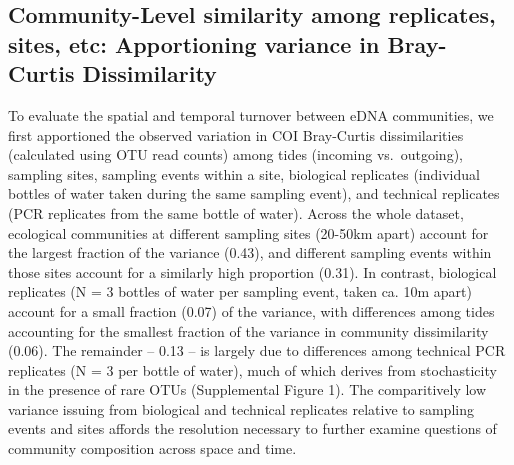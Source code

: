 \documentclass[fleqn,10pt,lineno]{wlpeerj} %
\begin{document}
\subsection{Community-Level similarity among replicates, sites, etc:
Apportioning variance in Bray-Curtis
Dissimilarity}\label{community-level-similarity-among-replicates-sites-etc-apportioning-variance-in-bray-curtis-dissimilarity}

To evaluate the spatial and temporal turnover between eDNA communities,
we first apportioned the observed variation in COI Bray-Curtis
dissimilarities (calculated using OTU read counts) among tides (incoming
vs.~outgoing), sampling sites, sampling events within a site, biological
replicates (individual bottles of water taken during the same sampling
event), and technical replicates (PCR replicates from the same bottle of
water). Across the whole dataset, ecological communities at different
sampling sites (20-50km apart) account for the largest fraction of the
variance (0.43), and different sampling events within those sites
account for a similarly high proportion (0.31). In contrast, biological
replicates (N = 3 bottles of water per sampling event, taken ca. 10m
apart) account for a small fraction (0.07) of the variance, with
differences among tides accounting for the smallest fraction of the
variance in community dissimilarity (0.06). The remainder -- 0.13 -- is
largely due to differences among technical PCR replicates (N = 3 per
bottle of water), much of which derives from stochasticity in the
presence of rare OTUs (Supplemental Figure 1). The comparitively low
variance issuing from biological and technical replicates relative to
sampling events and sites affords the resolution necessary to further
examine questions of community composition across space and time.
\end{document}
